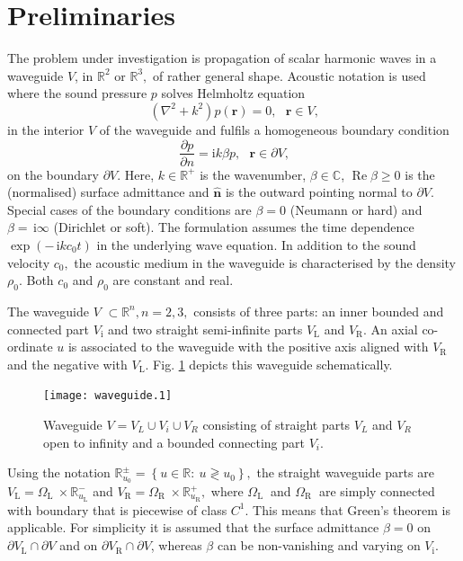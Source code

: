 \documentclass[a4paper,11pt]{article}
\renewcommand{\Re}{\operatorname{Re}}
\renewcommand{\i}{\,\mathrm{i}}
\begin{document}
\section{Preliminaries}
\label{sec:prel}

The problem under investigation is propagation of scalar harmonic
waves in a waveguide $V$, in $\mathbb{R}^{2}$ or $\mathbb{R}^{3},$ of
rather general shape. Acoustic notation is used where the sound
pressure $p$ solves Helmholtz equation%
\begin{equation}
  (\nabla^{2}+k^{2})p(\bm{r})=0,\text{ }\bm{r}\in V\text{,} \label{101}%
\end{equation}
in the interior $V$ of the waveguide and fulfils a homogeneous
boundary condition%
\begin{equation}
  \dfrac{\partial p}{\partial n}=\text{i}k\beta p,
  \text{ }\bm{r}\in\partial V\text{,} \label{102}%
\end{equation}
on the boundary $\partial V$. Here, $k\in\mathbb{R}^{+}$ is the
wavenumber, $\beta\in\mathbb{C}$, $\Re\beta\geq0$ is the (normalised)
surface admittance and $\widehat{\bm{n}}$ is the outward pointing
normal to $\partial V$. Special cases of the boundary conditions are
$\beta=0$ (Neumann or hard) and $\beta=\i\infty$ (Dirichlet or
soft). The formulation assumes the time dependence $\exp(-\i kc_{0}t)$
in the underlying wave equation. In addition to the sound velocity
$c_{0},$ the acoustic medium in the waveguide is characterised by the
density $\rho_{0}.$ Both $c_{0}$ and $\rho_{0}$ are constant and real.

The waveguide $V$ $\subset\mathbb{R}^{n},n=2,3,$ consists of three
parts: an inner bounded and connected part $V_{\text{i}}$ and two
straight semi-infinite parts $V_{\text{L}}$ and $V_{\text{R}}$. An
axial co-ordinate $u$ is associated to the waveguide with the positive
axis aligned with $V_{\text{R}}$ and the negative with $V_{\text{L}}.$
Fig.  \ref{fig:wg1} depicts this waveguide schematically.%
\begin{figure}[htb]
  \centering
  \texttt{[image: waveguide.1]}
  \caption{Waveguide $V=V_L\cup V_i\cup V_R$ consisting of straight
    parts $V_L$ and $V_R$ open to infinity and a bounded connecting
    part $V_i$.}
  \label{fig:wg1}
\end{figure}
Using the notation $\mathbb{R}_{u_0}^{\pm}=\left\{ u\in\mathbb{R}:\
  u\gtrless u_{0}\right\} ,$ the straight waveguide parts are
$V_{\text{L}%
}=\Omega_{\text{L }}\times\mathbb{R}_{u_{\text{L}}}^{-}$ and
$V_{\text{R}%
}=\Omega_{\text{R }}\times\mathbb{R}_{u_{\text{R}}}^{+},$ where
$\Omega _{\text{L }}$ and $\Omega_{\text{R }}$ are simply connected
with boundary that is piecewise of class $C^{1}.$ This means that
Green's theorem is applicable.  For simplicity it is assumed that the
surface admittance $\beta=0$ on $\partial V_{\text{L}}\cap\partial V$
and on $\partial V_{\text{R}}\cap\partial V$, whereas $\beta$ can be
non-vanishing and varying on $V_{\text{i}}.$
\end{document}
